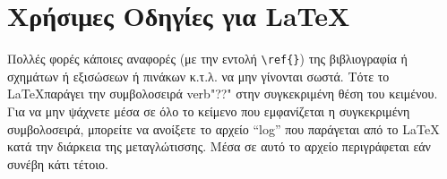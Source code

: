 \section{Χρήσιμες Οδηγίες για \LaTeX}
\label{sec:2.10}

Πολλές φορές κάποιες αναφορές (με την εντολή \verb"\ref{}") της
βιβλιογραφία ή σχημάτων ή εξισώσεων ή πινάκων κ.τ.λ. να μην
γίνονται σωστά. Τότε το \LaTeX παράγει την συμβολοσειρά verb"??"
στην συγκεκριμένη θέση του κειμένου. Για να μην ψάχνετε μέσα σε
όλο το κείμενο που εμφανίζεται η συγκεκριμένη συμβολοσειρά,
μπορείτε να ανοίξετε το αρχείο ``log'' που παράγεται από το \LaTeX
κατά την διάρκεια της μεταγλώτισσης. Μέσα σε αυτό το αρχείο
περιγράφεται εάν συνέβη κάτι τέτοιο.
